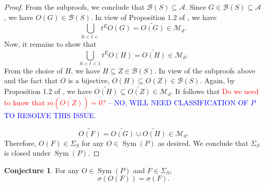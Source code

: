 \documentclass{article}
\theoremstyle{definition}
\newcommand\Sym{\operatorname{Sym}}
\theoremstyle{theorem}
\newtheorem{conjecture}[theorem]{Conjecture}
\begin{document}
\begin{proof}
From the subproofs, we conclude that $\mathcal{B}(S)\subseteq \mathcal{A}$. Since $G\in \mathcal{B}(S)\subseteq \mathcal{A}$, we have $O(G)\in \mathcal{B}(S)$. In view of Proposition 1.2 of \cite{RandlesBui2020}, we have
\begin{equation*}
    \bigcup_{0<t<} t^E O(G) = \widetilde{O(G)} \in \mathcal{M}_d.
\end{equation*}
Now, it remains to show that 
\begin{equation*}
    \bigcup_{0<t<1} t^E O(H) = \widetilde{O(H)} \in \mathcal{M}_d.
\end{equation*}
From the choice of $H$, we have $ H \subseteq Z \in \mathcal{B}(S)$. In view of the subproofs above and the fact that $O$ is a bijective, $O(H)\subseteq O(Z) \in \mathcal{B}(S)$. Again, by Proposition 1.2 of \cite{RandlesBui2020}, we have $\widetilde{O(H)} \subseteq \widetilde{O(Z)}\in \mathcal{M}_d$. 
It follows that \textcolor{red}{Do we need to know that $ m(\widetilde{O(Z)})=0$?} \textcolor{blue}{ -- NO, WILL NEED CLASSIFICATION OF $P$ TO RESOLVE THIS ISSUE.}

\begin{equation*}
    \widetilde{O(F)} = \widetilde{O(G)}\cup \widetilde{O(H)} \in \mathcal{M}_d.
\end{equation*}
Therefore,  $O(F)\in \Sigma_S$ for any $O\in \Sym{(P)}$ as desired. We conclude that $\Sigma_S$ is closed under $\Sym(P)$. 

\end{proof}


\begin{conjecture}
For any $O\in\Sym(P)$ and $F\in\Sigma_S$,
\begin{equation*}\label{eq:Conjec1}
\sigma(O (F))=\sigma(F).
\end{equation*} 
\end{conjecture}
\end{document}
